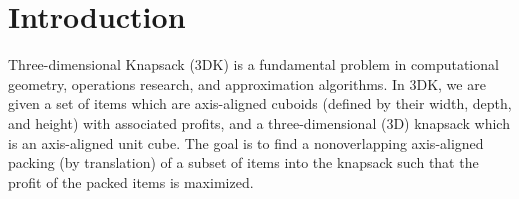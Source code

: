 \documentclass[10pt,a4paper]{amsart}
\newcommand{\tdk}{\textsc{3DK}}
\theoremstyle{definition}
\begin{document}
\newcommand{\drawGreenCuboidDashed}[7][$ $]{\draw[color=greenItem!75!black,dashed] (#2,#3,#4) -- (#2+#5,#3,#4);
	\draw[color=greenItem!75!black,dashed] (#2,#3,#4)-- (#2,#3+#6,#4);
	\draw[color=greenItem!75!black,dashed] (#2,#3,#4) -- (#2,#3,#4+#7);
	\draw[color=greenItem!75!black] (#2+#5,#3,#4) -- (#2+#5,#3+#6,#4);
	\draw[color=greenItem!75!black] (#2+#5,#3,#4) -- (#2+#5,#3,#4+#7);
	\draw[color=greenItem!75!black] (#2,#3+#6,#4) -- (#2,#3+#6,#4+#7);
	\draw[color=greenItem!75!black] (#2,#3+#6,#4) -- (#2+#5,#3+#6,#4);
	\draw[color=greenItem!75!black] (#2+#5,#3+#6,#4) -- (#2+#5,#3+#6,#4+#7);
	\draw[color=greenItem!75!black] (#2,#3+#6,#4+#7) -- (#2+#5,#3+#6,#4+#7);
	\draw[color=greenItem!75!black] (#2+#5,#3,#4+#7) -- (#2+#5,#3+#6,#4+#7);
	\draw[color=greenItem!75!black] (#2,#3,#4+#7) -- (#2+#5,#3,#4+#7);
	\draw[color=greenItem!75!black] (#2,#3,#4+#7) -- (#2,#3+#6,#4+#7);
	\node at (#2+0.5*#5, #3+0.5*#6, #4+0.5*#7) {#1};
}

\section{Introduction}
Three-dimensional Knapsack (\tdk) is a fundamental problem in computational geometry, operations research, and approximation algorithms. 
In 3DK, we are given a set of items which are axis-aligned cuboids (defined by their width, depth, and height) with associated profits, and a three-dimensional (3D) knapsack which is an axis-aligned unit cube. The goal is to find a nonoverlapping axis-aligned packing (by translation) of a subset of items into the knapsack such that the profit of the packed items is maximized. 
\end{document}
